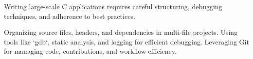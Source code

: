 \begin{comment}
11.4.2.2 Efficient Neural Network Implementation in C

11.5 C Today – Critical Systems and Emerging Technologies (2010s - Present)
11.5.1 Security and Cryptography in C

11.5.1.1 Writing Cryptographic Algorithms in C

11.5.1.2 Case Study: OpenSSL Vulnerability Patching

11.5.2 Embedded Systems and IoT Development

11.5.2.1 Writing Firmware for Modern Processors

11.5.2.2 Optimizing Low-Power Embedded Code

11.6 The Future of C in Software and Hardware Innovations
11.6.1 Rust vs C – The Shift Toward Safer Systems Programming

11.6.1.1 Understanding C’s Future in System-Level Development

11.6.1.2 Interoperability Between C and Modern Languages

11.6.2 AI-Based Optimization for C Applications

11.6.2.1 How AI Assists in Compiler Optimizations

11.6.2.2 Future Trends in C-Based High-Performance Computing
\end{comment}

\begin{NxSBox}
	\begin{NxIDBox}
		Writing large-scale C applications requires careful structuring, debugging techniques, and adherence to best practices.
	\end{NxIDBox}
	\begin{NxIDBoxL}
		 Organizing source files, headers, and dependencies in multi-file projects.
		 Using tools like `gdb`, static analysis, and logging for efficient debugging.
		 Leveraging Git for managing code, contributions, and workflow efficiency.
	\end{NxIDBoxL}
\end{NxSBox}

